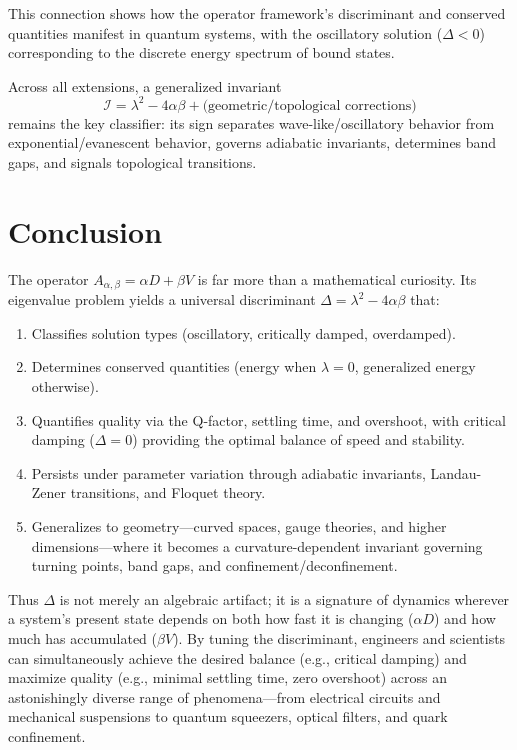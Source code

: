 \documentclass[11pt]{article}
\begin{document}
This connection shows how the operator framework's discriminant and conserved quantities manifest in quantum systems, with the oscillatory solution ($\Delta < 0$) corresponding to the discrete energy spectrum of bound states.

Across all extensions, a generalized invariant
\[
\mathcal{I} = \lambda^2 - 4\alpha\beta + \text{(geometric/topological corrections)}
\]
remains the key classifier: its sign separates wave-like/oscillatory behavior from exponential/evanescent behavior, governs adiabatic invariants, determines band gaps, and signals topological transitions.

\section{Conclusion}
The operator $A_{\alpha,\beta} = \alpha D + \beta V$ is far more than a mathematical curiosity. Its eigenvalue problem yields a universal discriminant $\Delta = \lambda^2 - 4\alpha\beta$ that:
\begin{enumerate}
\item Classifies solution types (oscillatory, critically damped, overdamped).
\item Determines conserved quantities (energy when $\lambda=0$, generalized energy otherwise).
\item Quantifies quality via the Q-factor, settling time, and overshoot, with critical damping ($\Delta=0$) providing the optimal balance of speed and stability.
\item Persists under parameter variation through adiabatic invariants, Landau-Zener transitions, and Floquet theory.
\item Generalizes to geometry—curved spaces, gauge theories, and higher dimensions—where it becomes a curvature-dependent invariant governing turning points, band gaps, and confinement/deconfinement.
\end{enumerate}
Thus $\Delta$ is not merely an algebraic artifact; it is a signature of dynamics wherever a system's present state depends on both how fast it is changing ($\alpha D$) and how much has accumulated ($\beta V$). By tuning the discriminant, engineers and scientists can simultaneously achieve the desired balance (e.g., critical damping) and maximize quality (e.g., minimal settling time, zero overshoot) across an astonishingly diverse range of phenomena—from electrical circuits and mechanical suspensions to quantum squeezers, optical filters, and quark confinement.
\end{document}
